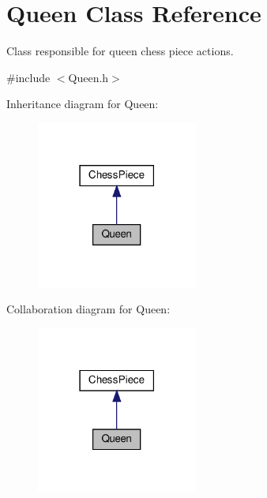 \hypertarget{classQueen}{}\section{Queen Class Reference}
\label{classQueen}


Class responsible for queen chess piece actions.  




{\ttfamily \#include $<$Queen.\+h$>$}



Inheritance diagram for Queen\+:\nopagebreak
\begin{figure}[H]
\begin{center}
\leavevmode
\includegraphics[width=150pt]{classQueen__inherit__graph}
\end{center}
\end{figure}


Collaboration diagram for Queen\+:\nopagebreak
\begin{figure}[H]
\begin{center}
\leavevmode
\includegraphics[width=150pt]{classQueen__coll__graph}
\end{center}
\end{figure}
